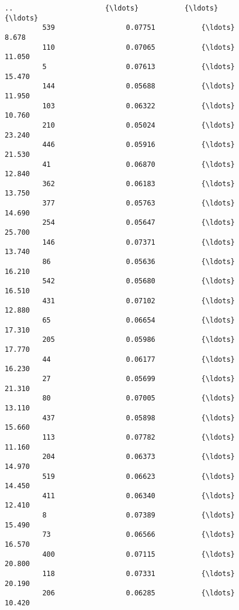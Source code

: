 \documentclass[11pt]{article}
\begin{document}
\begin{Verbatim}[commandchars=\\\{\}]
         ..                      {\ldots}           {\ldots}                      {\ldots}   
         539                 0.07751           {\ldots}                    8.678   
         110                 0.07065           {\ldots}                   11.050   
         5                   0.07613           {\ldots}                   15.470   
         144                 0.05688           {\ldots}                   11.950   
         103                 0.06322           {\ldots}                   10.760   
         210                 0.05024           {\ldots}                   23.240   
         446                 0.05916           {\ldots}                   21.530   
         41                  0.06870           {\ldots}                   12.840   
         362                 0.06183           {\ldots}                   13.750   
         377                 0.05763           {\ldots}                   14.690   
         254                 0.05647           {\ldots}                   25.700   
         146                 0.07371           {\ldots}                   13.740   
         86                  0.05636           {\ldots}                   16.210   
         542                 0.05680           {\ldots}                   16.510   
         431                 0.07102           {\ldots}                   12.880   
         65                  0.06654           {\ldots}                   17.310   
         205                 0.05986           {\ldots}                   17.770   
         44                  0.06177           {\ldots}                   16.230   
         27                  0.05699           {\ldots}                   21.310   
         80                  0.07005           {\ldots}                   13.110   
         437                 0.05898           {\ldots}                   15.660   
         113                 0.07782           {\ldots}                   11.160   
         204                 0.06373           {\ldots}                   14.970   
         519                 0.06623           {\ldots}                   14.450   
         411                 0.06340           {\ldots}                   12.410   
         8                   0.07389           {\ldots}                   15.490   
         73                  0.06566           {\ldots}                   16.570   
         400                 0.07115           {\ldots}                   20.800   
         118                 0.07331           {\ldots}                   20.190   
         206                 0.06285           {\ldots}                   10.420   
         

\end{Verbatim}
\end{document}
